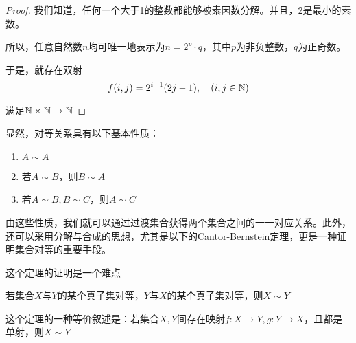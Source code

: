 \begin{proof}
    我们知道，任何一个大于1的整数都能够被素因数分解。并且，2是最小的素数。

    所以，任意自然数$n$均可唯一地表示为$n=2^p \cdot q$，其中$p$为非负整数，$q$为正奇数。

    于是，就存在双射
    \[f(i,j) = 2^{i-1}(2j-1),\quad (i,j\in \mathbb{N}) \]
    
    满足$\mathbb{N} \times \mathbb{N} \rightarrow \mathbb{N}$

\end{proof}

显然，对等关系具有以下基本性质：

\begin{enumerate}
    \item $A\sim A$
    \item 若$A\sim B$，则$B\sim A$
    \item 若$A\sim B,B\sim C$，则$A\sim C$
\end{enumerate}

由这些性质，我们就可以通过过渡集合获得两个集合之间的一一对应关系。此外，还可以采用分解与合成的思想，尤其是以下的Cantor-Bernstein定理，更是一种证明集合对等的重要手段。

\begin{remark}
    这个定理的证明是一个难点
\end{remark}

\begin{theorem}
    若集合$X$与$Y$的某个真子集对等，$Y$与$X$的某个真子集对等，则$X\sim Y$

    这个定理的一种等价叙述是：若集合$X,Y$间存在映射$f:X\rightarrow Y,g:Y\rightarrow X$，且都是单射，则$X\sim Y$
\end{theorem}


